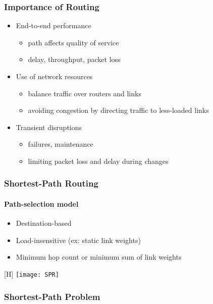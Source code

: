 \documentclass[../resumosRCOM.tex]{subfiles}
\begin{document}
\subsubsection{Importance of Routing}

\begin{itemize}
    \item End-to-end performance
    \begin{itemize}
        \item path affects quality of service
        \item delay, throughput, packet loss
    \end{itemize}
    \item Use of network resources
    \begin{itemize}
        \item balance traffic over routers and links
        \item avoiding congestion by directing traffic to less-loaded links
    \end{itemize}
    \item Transient disruptions
    \begin{itemize}
        \item failures, maintenance
        \item limiting packet loss and delay during changes
    \end{itemize}
\end{itemize}

\subsubsection{Shortest-Path Routing}

\paragraph{Path-selection model}

\begin{itemize}
    \item Destination-based
    \item Load-insensitive (ex: static link weights)
    \item Minimum hop count or minimum sum of link weights
\end{itemize}

\begin{center}[H]
    \texttt{[image: SPR]}
\end{center}

\subsubsection{Shortest-Path Problem}
\end{document}
